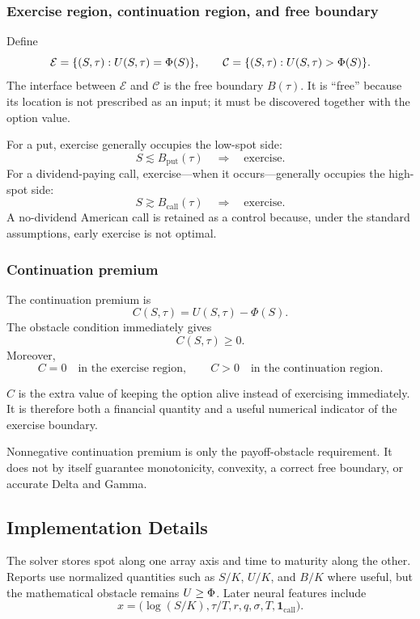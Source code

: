 \subsubsection{Exercise region, continuation region, and free boundary}
Define
\[
  \mathcal{E}
  =
  \{(S,\tau):U(S,\tau)=\Phi(S)\},
  \qquad
  \mathcal{C}
  =
  \{(S,\tau):U(S,\tau)>\Phi(S)\}.
\]
The interface between \(\mathcal{E}\) and \(\mathcal{C}\) is the free boundary
\(B(\tau)\). It is ``free'' because its location is not prescribed as an input;
it must be discovered together with the option value.

For a put, exercise generally occupies the low-spot side:
\[
  S\lesssim B_{\mathrm{put}}(\tau)
  \quad\Longrightarrow\quad
  \text{exercise}.
\]
For a dividend-paying call, exercise---when it occurs---generally occupies the
high-spot side:
\[
  S\gtrsim B_{\mathrm{call}}(\tau)
  \quad\Longrightarrow\quad
  \text{exercise}.
\]
A no-dividend American call is retained as a control because, under the
standard assumptions, early exercise is not optimal.

\subsubsection{Continuation premium}
The continuation premium is
\[
  C(S,\tau)=U(S,\tau)-\Phi(S).
\]
The obstacle condition immediately gives
\[
  C(S,\tau)\geq0.
\]
Moreover,
\[
  C=0 \quad\text{in the exercise region},
  \qquad
  C>0 \quad\text{in the continuation region}.
\]

\begin{readerintuition}
\(C\) is the extra value of keeping the option alive instead of exercising
immediately. It is therefore both a financial quantity and a useful numerical
indicator of the exercise boundary.
\end{readerintuition}

\begin{commonconfusion}
Nonnegative continuation premium is only the payoff-obstacle requirement. It
does not by itself guarantee monotonicity, convexity, a correct free boundary,
or accurate Delta and Gamma.
\end{commonconfusion}

\subsection{Implementation Details}
The solver stores spot along one array axis and time to maturity along the
other. Reports use normalized quantities such as \(S/K\), \(U/K\), and \(B/K\)
where useful, but the mathematical obstacle remains \(U\geq\Phi\).
Later neural features include
\[
  x=
  \bigl(
    \log(S/K),\tau/T,r,q,\sigma,T,
    \mathbf{1}_{\mathrm{call}}
  \bigr).
\]


